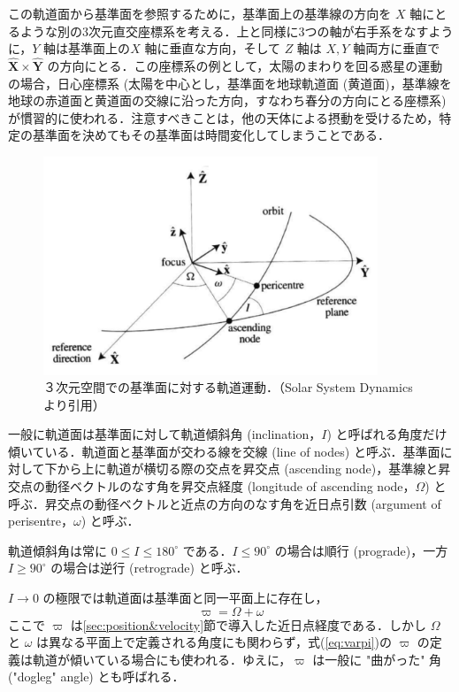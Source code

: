 \documentclass[11pt,a4paper,oneside,onecolumn]{jreport}
\begin{document}
この軌道面から基準面を参照するために，基準面上の基準線の方向を $X$ 軸にとるような別の3次元直交座標系を考える．上と同様に3つの軸が右手系をなすように，$Y$  軸は基準面上の$X$ 軸に垂直な方向，そして $Z$ 軸は $X, Y$ 軸両方に垂直で $\hat{\bm X} \times \hat{\bm Y}$ の方向にとる．この座標系の例として，太陽のまわりを回る惑星の運動の場合，日心座標系 (太陽を中心とし，基準面を地球軌道面 (黄道面)，基準線を地球の赤道面と黄道面の交線に沿った方向，すなわち春分の方向にとる座標系) が慣習的に使われる．注意すべきことは，他の天体による摂動を受けるため，特定の基準面を決めてもその基準面は時間変化してしまうことである．

\begin{figure}[H]
\centering
\includegraphics[width=10cm]{./image/sec2_13.pdf}
\caption{３次元空間での基準面に対する軌道運動．（Solar System Dynamics\cite{SSD} より引用）\label{fig:elements_SSD}}
\end{figure}

一般に軌道面は基準面に対して軌道傾斜角 (inclination，$I$) と呼ばれる角度だけ傾いている．軌道面と基準面が交わる線を交線 (line of nodes) と呼ぶ．基準面に対して下から上に軌道が横切る際の交点を昇交点 (ascending node)，基準線と昇交点の動径ベクトルのなす角を昇交点経度 (longitude of ascending node，$\Omega$) と呼ぶ．昇交点の動径ベクトルと近点の方向のなす角を近日点引数 (argument of perisentre，$\omega$) と呼ぶ．

軌道傾斜角は常に $0 \leq I \leq 180^{\circ}$ である．$I \leq 90 ^{\circ}$ の場合は順行 (prograde)，一方 $I \geq 90 ^{\circ}$ の場合は逆行 (retrograde) と呼ぶ．

$I \to 0$ の極限では軌道面は基準面と同一平面上に存在し，
\begin{equation}
\varpi = \Omega + \omega \label{eq:varpi}
\end{equation}
ここで $\varpi$ は\ref{sec:position&velocity}節で導入した近日点経度である．しかし $\Omega$ と $\omega$ は異なる平面上で定義される角度にも関わらず，式(\ref{eq:varpi})の $\varpi$ の定義は軌道が傾いている場合にも使われる．ゆえに，$\varpi$ は一般に "曲がった" 角 ("dogleg" angle) とも呼ばれる．
\end{document}
